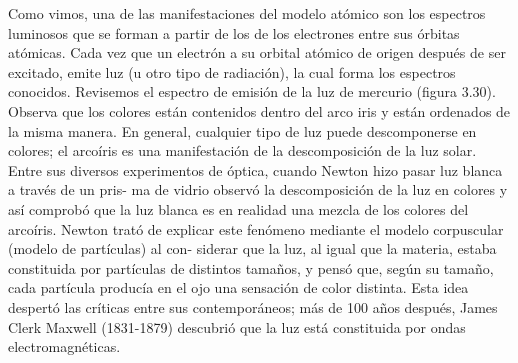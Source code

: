 \begin{warncard}[adjusted title={Composición y descomposición de la luz blanca}]
    Como vimos, una de las manifestaciones del modelo atómico son los espectros luminosos que se forman a partir de los  de los electrones entre sus órbitas atómicas.
    Cada vez que un electrón  a
    su orbital atómico de origen después
    de ser excitado, emite luz (u otro tipo
    de radiación), la cual forma los espectros conocidos. Revisemos el espectro
    de emisión de la luz de mercurio (figura 3.30).
    Observa que los colores están contenidos dentro del arco iris y están ordenados de
    la misma manera. En general, cualquier tipo de luz puede descomponerse en colores;
    el arcoíris es una manifestación de la descomposición de la luz solar. Entre sus diversos experimentos de óptica, cuando Newton hizo pasar luz blanca a través de un pris-
    ma de vidrio observó la descomposición de la luz en colores y así comprobó que la
    luz blanca es en realidad una mezcla de los colores del arcoíris. Newton trató de explicar este fenómeno mediante el modelo corpuscular (modelo de partículas) al con-
    siderar que la luz, al igual que la materia, estaba constituida por partículas de distintos
    tamaños, y pensó que, según su tamaño, cada partícula producía en el ojo una sensación de color distinta. Esta idea despertó las críticas entre sus contemporáneos; más
    de 100 años después, James Clerk Maxwell (1831-1879) descubrió que la luz está
    constituida por ondas electromagnéticas.
\end{warncard}